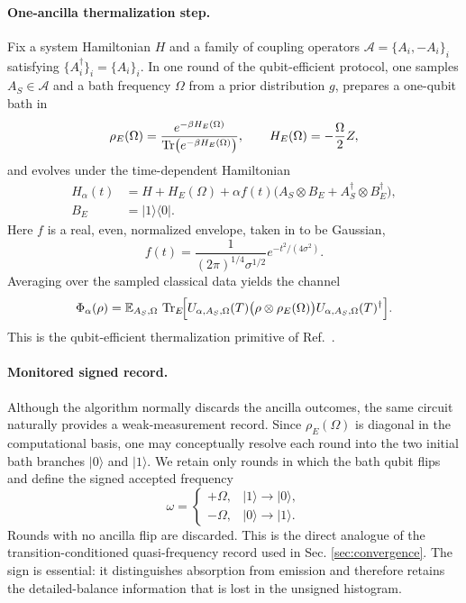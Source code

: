\documentclass[showpacs,amsmath,amssymb,twocolumn,prx,superscriptaddress,10pt,aps,nofootinbib]{revtex4-2}
\begin{document}
\paragraph{One-ancilla thermalization step.}
Fix a system Hamiltonian $H$ and a family of coupling operators $\mathcal A=\{A_i,-A_i\}_i$ satisfying $\{A_i^\dagger\}_i=\{A_i\}_i$. In one round of the qubit-efficient protocol, one samples $A_S\in\mathcal A$ and a bath frequency $\Omega$ from a prior distribution $g$, prepares a one-qubit bath in
\begin{equation}
\rho_E(\Omega)=\frac{e^{-\beta H_E(\Omega)}}{\Tr(e^{-\beta H_E(\Omega)})},
\qquad
H_E(\Omega)=-\frac{\Omega}{2}Z,
\end{equation}
and evolves under the time-dependent Hamiltonian
\begin{align}
H_\alpha(t)
&=
H+H_E(\Omega)
+
\alpha f(t)\bigl(A_S\otimes B_E+A_S^\dagger\otimes B_E^\dagger\bigr), \nonumber
\\
B_E&=|1\rangle\!\langle 0|.
\end{align}
Here $f$ is a real, even, normalized envelope, taken in \cite{Ding2025} to be Gaussian,
\begin{equation}
f(t)=\frac{1}{(2\pi)^{1/4}\sigma^{1/2}}e^{-t^2/(4\sigma^2)}.
\end{equation}
Averaging over the sampled classical data yields the channel
\begin{equation*}
\Phi_\alpha(\rho)
=
\mathbb E_{A_S,\Omega}\,
\Tr_E\!\Bigl[
U_{\alpha,A_S,\Omega}(T)
\bigl(\rho\otimes \rho_E(\Omega)\bigr)
U_{\alpha,A_S,\Omega}(T)^\dagger
\Bigr].
\end{equation*}
This is the qubit-efficient thermalization primitive of Ref.~\cite{Ding2025}.

\paragraph{Monitored signed record.}
Although the algorithm normally discards the ancilla outcomes, the same circuit naturally provides a weak-measurement record. Since $\rho_E(\Omega)$ is diagonal in the computational basis, one may conceptually resolve each round into the two initial bath branches $|0\rangle$ and $|1\rangle$. We retain only rounds in which the bath qubit flips and define the signed accepted frequency
\begin{equation}
\omega=
\begin{cases}
+\Omega,& |1\rangle\to |0\rangle,\\[0.5ex]
-\Omega,& |0\rangle\to |1\rangle.
\end{cases}
\end{equation}
Rounds with no ancilla flip are discarded. This is the direct analogue of the transition-conditioned quasi-frequency record used in Sec. \ref{sec:convergence}. The sign is essential: it distinguishes absorption from emission and therefore retains the detailed-balance information that is lost in the unsigned histogram.
\end{document}
